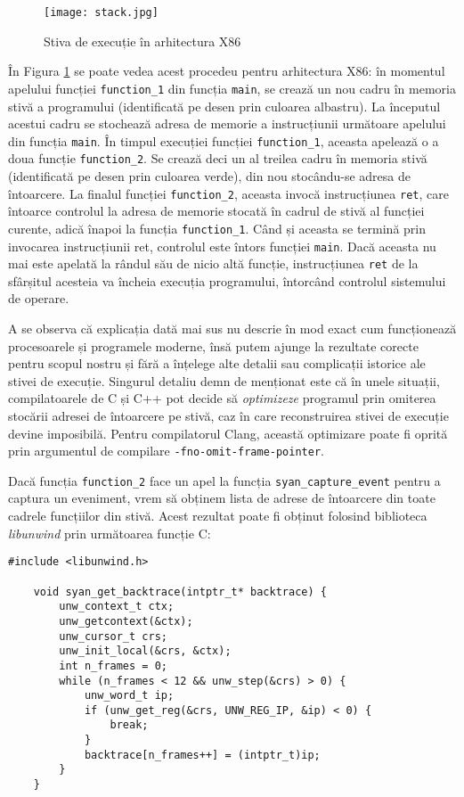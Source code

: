 \begin{figure}[ht]
\centering
\texttt{[image: stack.jpg]}
\caption{Stiva de execuție în arhitectura X86}
\label{fig:stack}
\end{figure}

În Figura \ref{fig:stack} se poate vedea acest procedeu pentru
arhitectura X86: în momentul apelului funcției \lstinline{function_1}
din funcția \lstinline{main}, se crează un nou cadru în memoria stivă a
programului (identificată pe desen prin culoarea albastru). La începutul
acestui cadru se stochează adresa de memorie a instrucțiunii următoare
apelului din funcția \lstinline{main}. În timpul execuției funcției
\lstinline{function_1}, aceasta apelează o a doua funcție
\lstinline{function_2}. Se crează deci un al treilea cadru în memoria
stivă (identificată pe desen prin culoarea verde), din nou stocându-se
adresa de întoarcere. La finalul funcției \lstinline{function_2},
aceasta invocă instrucțiunea \lstinline{ret}, care întoarce controlul la
adresa de memorie stocată în cadrul de stivă al funcției curente, adică
înapoi la funcția \lstinline{function_1}. Când și aceasta se termină
prin invocarea instrucțiunii ret, controlul este întors funcției
\lstinline{main}. Dacă aceasta nu mai este apelată la rândul său de
nicio altă funcție, instrucțiunea \lstinline{ret} de la sfârșitul
acesteia va încheia execuția programului, întorcând controlul sistemului
de operare.

A se observa că explicația dată mai sus nu descrie în mod exact cum
funcționează procesoarele și programele moderne, însă putem ajunge la
rezultate corecte pentru scopul nostru și fără a înțelege alte detalii
sau complicații istorice ale stivei de execuție. Singurul detaliu demn
de menționat este că în unele situații, compilatoarele de C și C++ pot
decide să \textit{optimizeze} programul prin omiterea stocării adresei
de întoarcere pe stivă, caz în care reconstruirea stivei de execuție
devine imposibilă. Pentru compilatorul Clang\cite{Clang}, această
optimizare poate fi oprită prin argumentul de compilare
\lstinline{-fno-omit-frame-pointer}.

Dacă funcția \lstinline{function_2} face un apel la funcția
\lstinline{syan_capture_event} pentru a captura un eveniment, vrem să
obținem lista de adrese de întoarcere din toate cadrele funcțiilor din
stivă. Acest rezultat poate fi obținut folosind biblioteca
\textit{libunwind}\cite{libunwind} prin următoarea funcție C:

\begin{lstlisting}[caption=Capturarea stivei de execuție folosind
                           \lstinline{libunwind}]
    #include <libunwind.h>

    void syan_get_backtrace(intptr_t* backtrace) {
        unw_context_t ctx;
        unw_getcontext(&ctx);
        unw_cursor_t crs;
        unw_init_local(&crs, &ctx);
        int n_frames = 0;
        while (n_frames < 12 && unw_step(&crs) > 0) {
            unw_word_t ip;
            if (unw_get_reg(&crs, UNW_REG_IP, &ip) < 0) {
                break;
            }
            backtrace[n_frames++] = (intptr_t)ip;
        }
    }
\end{lstlisting}

